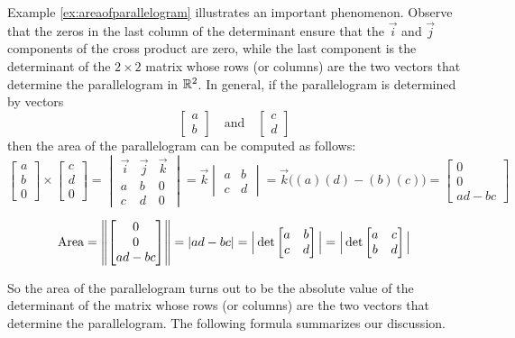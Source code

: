 \documentclass{ximera}
\begin{document}
Example \ref{ex:areaofparallelogram} illustrates an important phenomenon.  Observe that the zeros in the last column of the determinant ensure that the $\vec{i}$ and $\vec{j}$ components of the cross product are zero, while the last component is the determinant of the $2\times 2$ matrix whose rows (or columns) are the two vectors that determine the parallelogram in $\mathbb{R}^2$.  In general, if the parallelogram is determined by vectors 
$$\begin{bmatrix}a\\b\end{bmatrix}\quad\text{and}\quad\begin{bmatrix}c\\d\end{bmatrix}$$
then the area of the parallelogram can be computed as follows:
$$\begin{bmatrix}a\\b\\0\end{bmatrix}\times\begin{bmatrix}c\\d\\0\end{bmatrix}=\begin{vmatrix}\vec{i}&\vec{j}&\vec{k}\\a&b&0\\c&d&0\end{vmatrix}=\vec{k}\begin{vmatrix}a&b\\c&d\end{vmatrix}=\vec{k}\Big((a)(d)-(b)(c)\Big)=\begin{bmatrix}0\\0\\ad-bc\end{bmatrix}$$

$$\mbox{Area}=\left\lVert\begin{bmatrix}0\\0\\ad-bc\end{bmatrix}\right\rVert=|ad-bc|=\Big|\det\begin{bmatrix}a&b\\c&d\end{bmatrix}\Big|=\Big|\det\begin{bmatrix}a&c\\b&d\end{bmatrix}\Big|$$

So the area of the parallelogram turns out to be the absolute value of the determinant of the matrix whose rows (or columns) are the two vectors that determine the parallelogram. 
The following formula summarizes our discussion.
\end{document}
